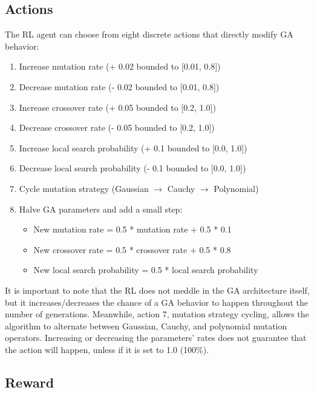 \documentclass{article}
\begin{document}
\subsection{Actions}

The RL agent can choose from eight discrete actions that directly modify GA behavior:
\begin{enumerate}
    \item Increase mutation rate (+ 0.02 bounded to [0.01, 0.8])
    \item Decrease mutation rate (- 0.02 bounded to [0.01, 0.8])
    \item Increase crossover rate (+ 0.05 bounded to [0.2, 1.0])
    \item Decrease crossover rate (- 0.05 bounded to [0.2, 1.0])
    \item Increase local search probability (+ 0.1 bounded to [0.0, 1.0])
    \item Decrease local search probability (- 0.1 bounded to [0.0, 1.0])
    \item Cycle mutation strategy (Gaussian $\rightarrow$ Cauchy $\rightarrow$ Polynomial)
    \item Halve GA parameters and add a small step: 
    \begin{itemize}
        \item New mutation rate = 0.5 * mutation rate  + 0.5 * 0.1
        \item New crossover rate = 0.5 * crossover rate + 0.5 * 0.8
        \item New local search probability = 0.5 * local search probability
    \end{itemize}
\end{enumerate}
It is important to note that the RL does not meddle in the GA architecture itself, but it increases/decreases the chance of a GA behavior to happen throughout the number of generations. Meanwhile, action 7, mutation strategy cycling, allows the algorithm to alternate between Gaussian, Cauchy, and polynomial mutation operators. Increasing or decreasing the parameters' rates does not guarantee that the action will happen, unless if it is set to 1.0 (100\%).

\subsection{Reward}
\end{document}
